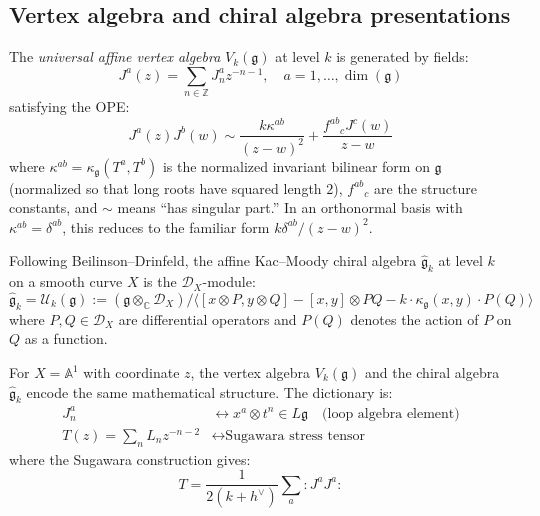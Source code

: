 \subsection{Vertex algebra and chiral algebra presentations}

\begin{definition}
The \emph{universal affine vertex algebra} $V_k(\mathfrak{g})$ at level $k$ is generated by fields:
\begin{equation}
J^a(z) = \sum_{n \in \mathbb{Z}} J^a_n z^{-n-1}, \quad a = 1,\ldots,\dim(\mathfrak{g})
\end{equation}
satisfying the OPE:
\begin{equation}\label{eq:affine-kac-moody-ope}
J^a(z) J^b(w) \sim \frac{k \kappa^{ab}}{(z-w)^2} + \frac{{f^{ab}}_c J^c(w)}{z-w}
\end{equation}
where $\kappa^{ab} = \kappa_{\mathfrak{g}}(T^a, T^b)$ is the normalized invariant bilinear form on $\mathfrak{g}$ (normalized so that long roots have squared length $2$), ${f^{ab}}_c$ are the structure constants, and $\sim$ means ``has singular part.'' In an orthonormal basis with $\kappa^{ab} = \delta^{ab}$, this reduces to the familiar form $k\delta^{ab}/(z-w)^2$.
\end{definition}

\begin{definition}\label{def:chiral-kac-moody}
Following Beilinson--Drinfeld, the affine Kac--Moody chiral algebra $\widehat{\mathfrak{g}}_k$ at level $k$ on a smooth curve $X$ is the $\mathcal{D}_X$-module:
\begin{equation}
\widehat{\mathfrak{g}}_k = \mathcal{U}_k(\mathfrak{g}) := \left(\mathfrak{g} \otimes_{\mathbb{C}} \mathcal{D}_X\right) / \langle [x \otimes P, y \otimes Q] - [x,y] \otimes PQ - k \cdot \kappa_{\mathfrak{g}}(x,y) \cdot P(Q) \rangle
\end{equation}
where $P, Q \in \mathcal{D}_X$ are differential operators and $P(Q)$ denotes the action of $P$ on $Q$ as a function.
\end{definition}

\begin{theorem}\label{thm:vertex-chiral-equivalence}
For $X = \mathbb{A}^1$ with coordinate $z$, the vertex algebra $V_k(\mathfrak{g})$ and the chiral algebra $\widehat{\mathfrak{g}}_k$ encode the same mathematical structure. The dictionary is:
\begin{align}
J^a_n &\longleftrightarrow x^a \otimes t^n \in L\mathfrak{g} \quad \text{(loop algebra element)} \\
T(z) = \sum_n L_n z^{-n-2} &\longleftrightarrow \text{Sugawara stress tensor}
\end{align}
where the Sugawara construction gives:
\begin{equation}
T = \frac{1}{2(k+h^\vee)} \sum_a {:}J^a J^a{:}
\end{equation}
\end{theorem}

